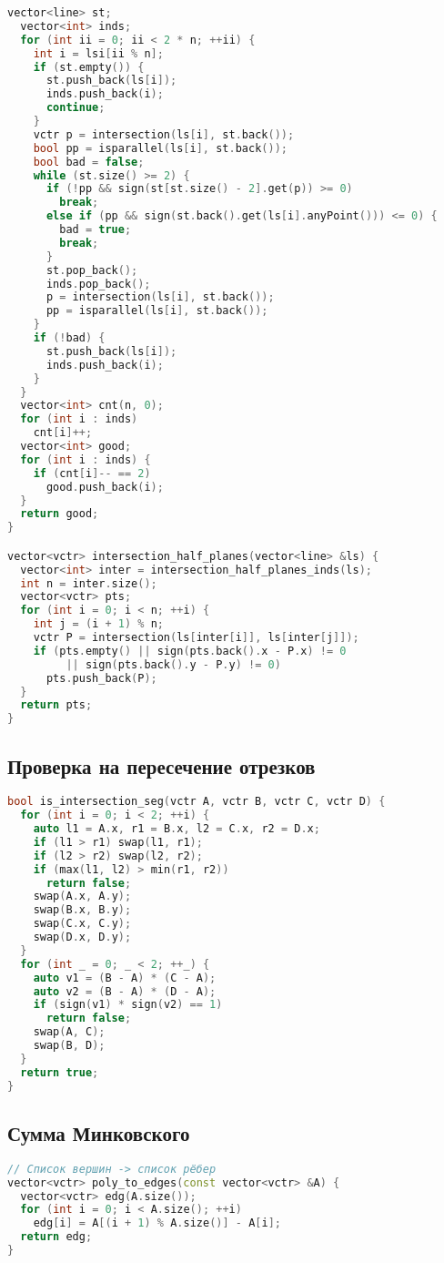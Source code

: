 \documentclass[9pt,a4paper,landscape,twosided]{extarticle}
\begin{document}
\begin{multicols*}{3}
\begin{lstlisting}[language=C++]
  vector<line> st;
  vector<int> inds;
  for (int ii = 0; ii < 2 * n; ++ii) {
    int i = lsi[ii % n];
    if (st.empty()) {
      st.push_back(ls[i]);
      inds.push_back(i);
      continue;
    }
    vctr p = intersection(ls[i], st.back());
    bool pp = isparallel(ls[i], st.back());
    bool bad = false;
    while (st.size() >= 2) {
      if (!pp && sign(st[st.size() - 2].get(p)) >= 0)
        break;
      else if (pp && sign(st.back().get(ls[i].anyPoint())) <= 0) {
        bad = true;
        break;
      }
      st.pop_back();
      inds.pop_back();
      p = intersection(ls[i], st.back());
      pp = isparallel(ls[i], st.back());
    }
    if (!bad) {
      st.push_back(ls[i]);
      inds.push_back(i);
    }
  }
  vector<int> cnt(n, 0);
  for (int i : inds)
    cnt[i]++;
  vector<int> good;
  for (int i : inds) {
    if (cnt[i]-- == 2)
      good.push_back(i);
  }
  return good;
}

vector<vctr> intersection_half_planes(vector<line> &ls) {
  vector<int> inter = intersection_half_planes_inds(ls);
  int n = inter.size();
  vector<vctr> pts;
  for (int i = 0; i < n; ++i) {
    int j = (i + 1) % n;
    vctr P = intersection(ls[inter[i]], ls[inter[j]]);
    if (pts.empty() || sign(pts.back().x - P.x) != 0
         || sign(pts.back().y - P.y) != 0)
      pts.push_back(P);
  }
  return pts;
}

\end{lstlisting}

\subsection{Проверка на пересечение отрезков}
\begin{lstlisting}[language=C++]
bool is_intersection_seg(vctr A, vctr B, vctr C, vctr D) {
  for (int i = 0; i < 2; ++i) {
    auto l1 = A.x, r1 = B.x, l2 = C.x, r2 = D.x;
    if (l1 > r1) swap(l1, r1);
    if (l2 > r2) swap(l2, r2);
    if (max(l1, l2) > min(r1, r2))
      return false;
    swap(A.x, A.y);
    swap(B.x, B.y);
    swap(C.x, C.y);
    swap(D.x, D.y);
  }
  for (int _ = 0; _ < 2; ++_) {
    auto v1 = (B - A) * (C - A);
    auto v2 = (B - A) * (D - A);
    if (sign(v1) * sign(v2) == 1)
      return false;
    swap(A, C);
    swap(B, D);
  }
  return true;
}

\end{lstlisting}

\subsection{Сумма Минковского}
\begin{lstlisting}[language=C++]
// Список вершин -> список рёбер
vector<vctr> poly_to_edges(const vector<vctr> &A) {
  vector<vctr> edg(A.size());
  for (int i = 0; i < A.size(); ++i)
    edg[i] = A[(i + 1) % A.size()] - A[i];
  return edg;
}


\end{lstlisting}
\end{multicols*}
\end{document}
